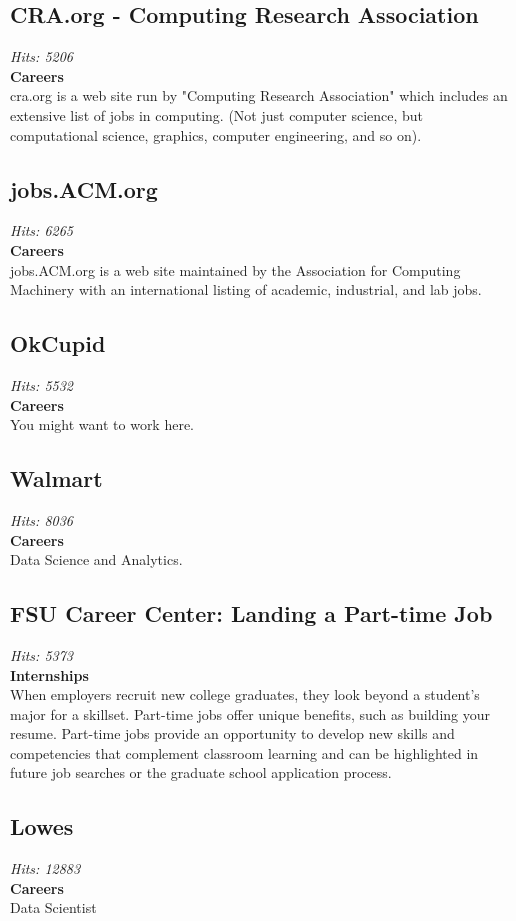 \documentclass[12pt,a4paper]{article}
\begin{document}
\subsection{CRA.org - Computing Research Association}
\textit{Hits: 5206} \\
\textbf{Careers} \\
cra.org is a web site run by "Computing Research Association" which includes an extensive list of jobs in computing. (Not just computer science, but computational science, graphics, computer engineering, and so on).

\subsection{jobs.ACM.org}
\textit{Hits: 6265} \\
\textbf{Careers} \\
jobs.ACM.org is a web site maintained by the Association for Computing Machinery with an international listing of academic, industrial, and lab jobs.

\subsection{OkCupid}
\textit{Hits: 5532} \\
\textbf{Careers} \\
You might want to work here.

\subsection{Walmart}
\textit{Hits: 8036} \\
\textbf{Careers} \\
Data Science and Analytics.

\subsection{FSU Career Center: Landing a Part-time Job}
\textit{Hits: 5373} \\
\textbf{Internships} \\
When employers recruit new college graduates, they look beyond a student’s major for a skillset. Part-time jobs offer unique benefits, such as building your resume. Part-time jobs provide an opportunity to develop new skills and competencies that complement classroom learning and can be highlighted in future job searches or the graduate school application process.

\subsection{Lowes}
\textit{Hits: 12883} \\
\textbf{Careers} \\
Data Scientist
\end{document}
